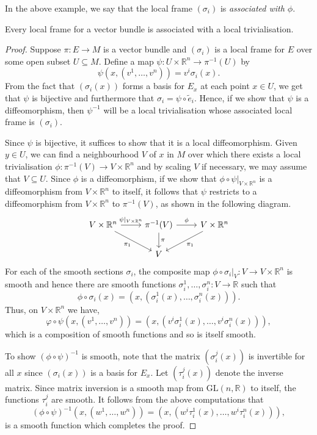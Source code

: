 \documentclass[12pt,a4paper]{article}
\begin{document}
In the above example, we say that the local frame $(\sigma_i)$ is \textit{associated with $\phi$}.
\begin{proposition}
Every local frame for a vector bundle is associated with a local trivialisation.
\label{vb-lf-lt}
\end{proposition}
\begin{proof}
Suppose $\pi:E\to M$ is a vector bundle and $(\sigma_i)$ is a local frame for $E$ over some open subset $U\subseteq M$. Define a map $\psi:U\times\mathbb{R}^n\to\pi^{-1}(U)$ by
\[
\psi(x,(v^1,\ldots,v^n))=v^i\sigma_i(x).
\]
From the fact that $(\sigma_i(x))$ forms a basis for $E_x$ at each point $x\in U$, we get that $\psi$ is bijective and furthermore that $\sigma_i=\psi\circ\tilde{e}_i$. Hence, if we show that $\psi$ is a diffeomorphism, then $\psi^{-1}$ will be a local trivialisation whose associated local frame is $(\sigma_i)$.

Since $\psi$ is bijective, it suffices to show that it is a local diffeomorphism. Given $y\in U$, we can find a neighbourhood $V$ of $x$ in $M$ over which there exists a local trivialisation $\phi:\pi^{-1}(V)\to V\times\mathbb{R}^n$ and by scaling $V$ if necessary, we may assume that $V\subseteq U$. Since $\phi$ is a diffeomorphism, if we show that $\phi\circ\psi\rvert_{V\times\mathbb{R}^n}$ is a diffeomorphism from $V\times\mathbb{R}^n$ to itself, it follows that $\psi$ restricts to a diffeomorphism from $V\times\mathbb{R}^n$ to $\pi^{-1}(V)$, as shown in the following diagram.
\[
\begin{tikzcd}
V\times\mathbb{R}^n\arrow{dr}[swap]{\pi_1} \arrow{r}{\psi\rvert_{V\times\mathbb{R}^n}} & \pi^{-1}(V) \arrow{r}{\phi} \arrow{d}{\pi} & V\times\mathbb{R}^n \arrow{dl}{\pi_1}\\
& V
\end{tikzcd}
\]
For each of the smooth sections $\sigma_i$, the composite map $\phi\circ\sigma_i\rvert_V:V\to V\times\mathbb{R}^n$ is smooth and hence there are smooth functions $\sigma^1_i,\ldots,\sigma^n_i:V\to\mathbb{R}$ such that
\[
\phi\circ\sigma_i(x)=\left(x,\left(\sigma^1_i(x),\ldots,\sigma^n_i(x) \right) \right).
\]
Thus, on $V\times\mathbb{R}^n$ we have,
\[
\varphi\circ\psi\left(x,(v^1,\ldots,v^n) \right)=\left(x,\left(v^i\sigma^1_i(x),\ldots,v^i\sigma^n_i(x) \right) \right),
\]
which is a composition of smooth functions and so is itself smooth.

To show $(\phi\circ\psi)^{-1}$ is smooth, note that the matrix $(\sigma^j_i(x))$ is invertible for all $x$ since $(\sigma_i(x))$ is a basis for $E_x$. Let $(\tau^j_i(x))$ denote the inverse matrix. Since matrix inversion is a smooth map from $\mathrm{GL}(n,\mathbb{R})$ to itself, the functions $\tau^j_i$ are smooth. It follows from the above computations that
\[
(\phi\circ\psi)^{-1}\left(x,(w^1,\ldots,w^n)\right)=\left(x,\left(w^i\tau^1_i(x),\ldots,w^i\tau^n_i(x) \right) \right),
\]
is a smooth function which completes the proof.
\end{proof}
\end{document}

